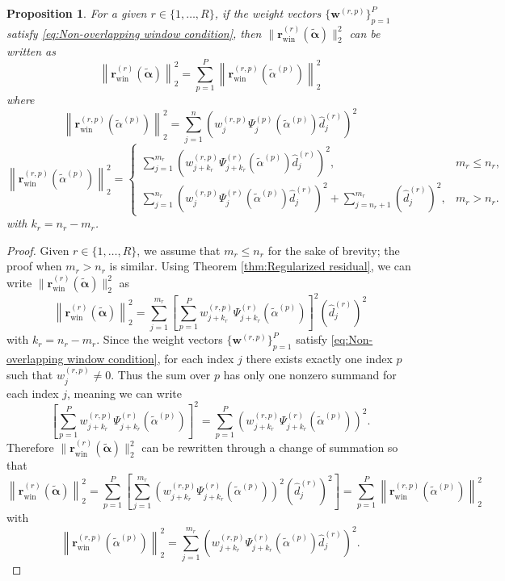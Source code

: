 \documentclass[12pt]{article}
\newcommand{\rVec}{\mathbf{r}}	%
\newcommand{\wVec}{\mathbf{w}}	%
\newcommand{\regparam}{\alpha}  %
\newcommand{\regparamVec}{\bm{\regparam}}   %
\newcommand{\regparamBig}{\widetilde{\regparam}}   %
\newcommand{\regparamVecBig}{\widetilde{\regparamVec}}   %
\newcommand{\rWin}{\rVec_{\text{win}}}	%
\newtheorem{proposition}{Proposition}[section]
\begin{document}
\begin{proposition}
\label{prop:Non-overlapping windows}
For a given $r \in \{1,\ldots,R\}$, if the weight vectors $\{\wVec^{(r,p)}\}_{p=1}^{P}$ satisfy \eqref{eq:Non-overlapping window condition}, then $\|\rWin^{(r)}(\regparamVecBig)\|_2^2$ can be written as
\[\left\|\rWin^{(r)}(\regparamVecBig)\right\|_2^2 = \sum_{p=1}^{P} \left\|\rWin^{(r,p)}(\regparamBig^{(p)})\right\|_2^2\]
where
\[\left\|\rWin^{(r,p)}(\regparamBig^{(p)})\right\|_2^2 = \sum_{j=1}^{n} \left(w_j^{(r,p)} \Psi_j^{(p)}\left(\regparamBig^{(p)}\right)\hat{d}_j^{(r)}\right)^2\]
\[\left\|\rWin^{(r,p)}(\regparamBig^{(p)})\right\|_2^2 = \begin{cases} \sum_{j=1}^{m_r} \left(w_{j+k_r}^{(r,p)}\Psi_{j+k_r}^{(r)}\left(\regparamBig^{(p)}\right) \hat{d}_j^{(r)}\right)^2, & m_r \leq n_r, \\
\sum_{j=1}^{n_r} \left(w_{j}^{(r,p)}\Psi_{j}^{(r)}\left(\regparamBig^{(p)}\right) \hat{d}_j^{(r)}\right)^2 + \sum_{j = n_r + 1}^{m_r} \left(\hat{d}_j^{(r)}\right)^2, & m_r > n_r.
\end{cases}\]
with $k_r = n_r - m_r$.
\end{proposition}
\begin{proof}
Given $r \in \{1,\ldots,R\}$, we assume that $m_r \leq n_r$ for the sake of brevity; the proof when $m_r > n_r$ is similar. Using Theorem \ref{thm:Regularized residual}, we can write $\|\rWin^{(r)}(\regparamVecBig)\|_2^2$ as
\[\left\|\rWin^{(r)}(\regparamVecBig)\right\|_2^2 = \sum_{j=1}^{m_r} \left[\sum_{p=1}^{P} w_{j+k_r}^{(r,p)}\Psi_{j+k_r}^{(r)}\left(\regparamBig^{(p)}\right)\right]^2 \left(\hat{d}_j^{(r)}\right)^2\]
with $k_r = n_r - m_r$. Since the weight vectors $\{\wVec^{(r,p)}\}_{p=1}^{P}$ satisfy \eqref{eq:Non-overlapping window condition}, for each index $j$ there exists exactly one index $p$ such that $w^{(r,p)}_j \neq 0$. Thus the sum over $p$ has only one nonzero summand for each index $j$, meaning we can write
\[\left[\sum_{p=1}^{P} w_{j + k_r}^{(r,p)} \Psi_{j + k_r}^{(r)}\left(\regparamBig^{(p)}\right) \right]^2 = \sum_{p=1}^{P} \left(w_{j + k_r}^{(r,p)} \Psi_{j + k_r}^{(r)}\left(\regparamBig^{(p)}\right)\right)^2.\]
Therefore $\|\rWin^{(r)}(\regparamVecBig)\|_2^2$ can be rewritten through a change of summation so that
\[\left\|\rWin^{(r)}(\regparamVecBig)\right\|_2^2 = \sum_{p=1}^{P} \left[ \sum_{j=1}^{m_r} \left( w_{j + k_r}^{(r,p)} \Psi_{j + k_r}^{(r)}\left(\regparamBig^{(p)}\right)\right)^2 \left(\hat{d}_j^{(r)}\right)^2\right] = \sum_{p=1}^{P} \left\|\rWin^{(r,p)}(\regparamBig^{(p)})\right\|_2^2\]
with
\[\left\|\rWin^{(r,p)}(\regparamBig^{(p)})\right\|_2^2 = \sum_{j=1}^{m_r} \left(w_{j + k_r}^{(r,p)} \Psi_{j + k_r}^{(r)}\left(\regparamBig^{(p)}\right)\hat{d}_j^{(r)}\right)^2.\]
\end{proof}
\end{document}
